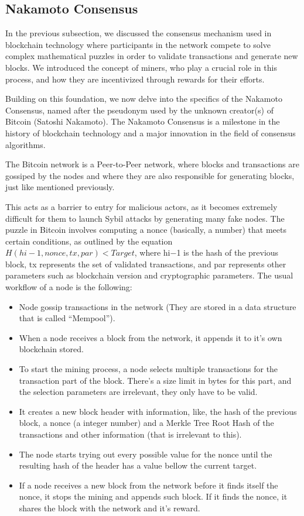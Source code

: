 \subsection*{Nakamoto Consensus}
In the previous subsection, we discussed the consensus mechanism used in blockchain technology where participants in the network compete to solve complex mathematical puzzles in order to validate transactions and generate new blocks.
We introduced the concept of miners, who play a crucial role in this process, and how they are incentivized through rewards for their efforts.

Building on this foundation, we now delve into the specifics of the Nakamoto Consensus, named after the pseudonym used by the unknown creator(s) of Bitcoin (Satoshi Nakamoto). The Nakamoto Consensus is a milestone in the history of blockchain technology and a major innovation in the field of consensus algorithms.

The Bitcoin network is a Peer-to-Peer network, where blocks and transactions are gossiped by the nodes and where they are also responsible for generating blocks, just like mentioned previously.

This acts as a barrier to entry for malicious actors, as it becomes extremely difficult for them to launch Sybil attacks by generating many fake nodes.
The puzzle in Bitcoin involves computing a nonce (basically, a number) that meets certain conditions, as outlined by the equation $H(hi−1,nonce,tx,par) < Target$, where hi−1 is the hash of the previous block, tx represents the set of validated transactions, and par represents other parameters such as blockchain version and cryptographic parameters.
The usual workflow of a node is the following:
\begin{itemize}
    \item Node gossip transactions in the network (They are stored in a data structure that is called ``Mempool'').
    \item When a node receives a block from the network, it appends it to it's own blockchain stored.
    \item To start the mining process, a node selects multiple transactions for the transaction part of the block. There's a size limit in bytes for this part, and the selection parameters are irrelevant, they only have to be valid.
    \item It creates a new block header with information, like, the hash of the previous block, a nonce (a integer number) and a Merkle Tree Root Hash of the transactions and other information (that is irrelevant to this).
    \item The node starts trying out every possible value for the nonce until the resulting hash of the header has a value bellow the current target.
    \item If a node receives a new block from the network before it finds itself the nonce, it stops the mining and appends such block. If it finds the nonce, it shares the block with the network and it's reward.
    
\end{itemize}

